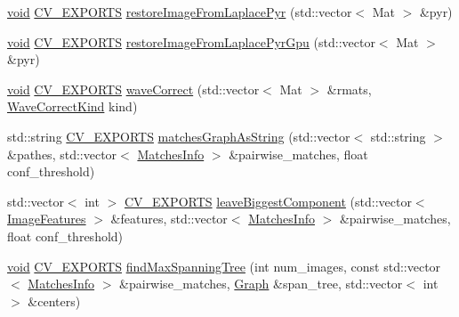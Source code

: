 \begin{DoxyCompactItemize}
\item 
\hyperlink{legacy_8hpp_a8bb47f092d473522721002c86c13b94e}{void} \hyperlink{core_2types__c_8h_a1bf9f0e121b54272da02379cfccd0a2b}{C\-V\-\_\-\-E\-X\-P\-O\-R\-T\-S} \hyperlink{namespacecv_1_1detail_a6d838447ce02b7aae0d10522a233b85a}{restore\-Image\-From\-Laplace\-Pyr} (std\-::vector$<$ Mat $>$ \&pyr)
\item 
\hyperlink{legacy_8hpp_a8bb47f092d473522721002c86c13b94e}{void} \hyperlink{core_2types__c_8h_a1bf9f0e121b54272da02379cfccd0a2b}{C\-V\-\_\-\-E\-X\-P\-O\-R\-T\-S} \hyperlink{namespacecv_1_1detail_a6d0b3898834ef5dd79c97e5132fcf398}{restore\-Image\-From\-Laplace\-Pyr\-Gpu} (std\-::vector$<$ Mat $>$ \&pyr)
\item 
\hyperlink{legacy_8hpp_a8bb47f092d473522721002c86c13b94e}{void} \hyperlink{core_2types__c_8h_a1bf9f0e121b54272da02379cfccd0a2b}{C\-V\-\_\-\-E\-X\-P\-O\-R\-T\-S} \hyperlink{namespacecv_1_1detail_ac583c4f246034e2323519c4af6da4b90}{wave\-Correct} (std\-::vector$<$ Mat $>$ \&rmats, \hyperlink{namespacecv_1_1detail_a83b24d4c3e93584986a56d9e43b9cf7f}{Wave\-Correct\-Kind} kind)
\item 
std\-::string \hyperlink{core_2types__c_8h_a1bf9f0e121b54272da02379cfccd0a2b}{C\-V\-\_\-\-E\-X\-P\-O\-R\-T\-S} \hyperlink{namespacecv_1_1detail_a2b91adde40886380da4ad9c966c70373}{matches\-Graph\-As\-String} (std\-::vector$<$ std\-::string $>$ \&pathes, std\-::vector$<$ \hyperlink{structcv_1_1detail_1_1MatchesInfo}{Matches\-Info} $>$ \&pairwise\-\_\-matches, float conf\-\_\-threshold)
\item 
std\-::vector$<$ int $>$ \hyperlink{core_2types__c_8h_a1bf9f0e121b54272da02379cfccd0a2b}{C\-V\-\_\-\-E\-X\-P\-O\-R\-T\-S} \hyperlink{namespacecv_1_1detail_afba361771da1902ccebe2655d1c705e7}{leave\-Biggest\-Component} (std\-::vector$<$ \hyperlink{structcv_1_1detail_1_1ImageFeatures}{Image\-Features} $>$ \&features, std\-::vector$<$ \hyperlink{structcv_1_1detail_1_1MatchesInfo}{Matches\-Info} $>$ \&pairwise\-\_\-matches, float conf\-\_\-threshold)
\item 
\hyperlink{legacy_8hpp_a8bb47f092d473522721002c86c13b94e}{void} \hyperlink{core_2types__c_8h_a1bf9f0e121b54272da02379cfccd0a2b}{C\-V\-\_\-\-E\-X\-P\-O\-R\-T\-S} \hyperlink{namespacecv_1_1detail_aba0b4a98942144a2cfb7a82a39e2fdc1}{find\-Max\-Spanning\-Tree} (int num\-\_\-images, const std\-::vector$<$ \hyperlink{structcv_1_1detail_1_1MatchesInfo}{Matches\-Info} $>$ \&pairwise\-\_\-matches, \hyperlink{classcv_1_1detail_1_1Graph}{Graph} \&span\-\_\-tree, std\-::vector$<$ int $>$ \&centers)
\item 

\end{DoxyCompactItemize}
